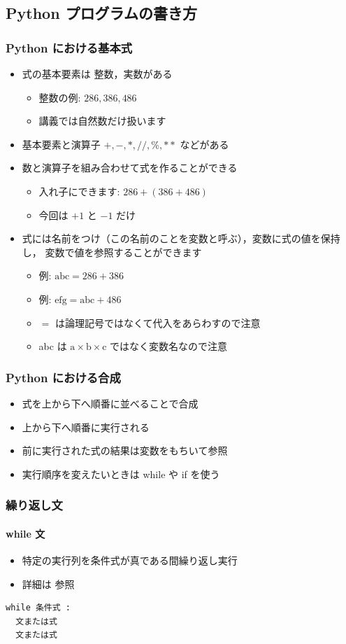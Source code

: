 \subsection{Python プログラムの書き方}
\begin{frame}[fragile]
\frametitle{Python における基本式}
  \begin{itemize}
\item 式の基本要素は 整数，実数がある
    \begin{itemize}
\item 整数の例: \(286, 386, 486\) 
\item 講義では自然数だけ扱います
    \end{itemize}
\item 基本要素と演算子 \(+, -, *, \slash\slash, \%, **\) などがある
\item 数と演算子を組み合わせて式を作ることができる
    \begin{itemize}
\item 入れ子にできます: \(286+(386+486)\) 
\item 今回は \(+1\) と \(-1\) だけ
    \end{itemize}
\item 式には名前をつけ（この名前のことを変数と呼ぶ），変数に式の値を保持し，
変数で値を参照することができます
    \begin{itemize}
\item 例: \(\mbox{abc}=286+386\) 
\item 例: \(\mbox{efg}=\mbox{abc}+486\) 
\item $=$ は論理記号ではなくて代入をあらわすので注意
\item abc は \(\mbox{a}\times\mbox{b}\times\mbox{c}\) ではなく変数名なので注意
    \end{itemize}
  \end{itemize}
\end{frame}
\begin{frame}[label=composit]
\frametitle{Python における合成}
  \begin{itemize}
\item 式を上から下へ順番に並べることで合成
\item 上から下へ順番に実行される
\item 前に実行された式の結果は変数をもちいて参照
\item 実行順序を変えたいときは while や if を使う
  \end{itemize}
\end{frame}
\begin{frame}[fragile,label=while]
\frametitle{繰り返し文}
\framesubtitle{while 文}
  \begin{itemize}
\item 特定の実行列を条件式が真である間繰り返し実行
\item 詳細は \href{https://docs.python.org/ja/3/reference/index.html}{}参照
  \end{itemize}
  \begin{lstlisting}[caption={while 文}]
while 条件式 :
  文または式
  文または式
  
  \end{lstlisting}
\end{frame}
